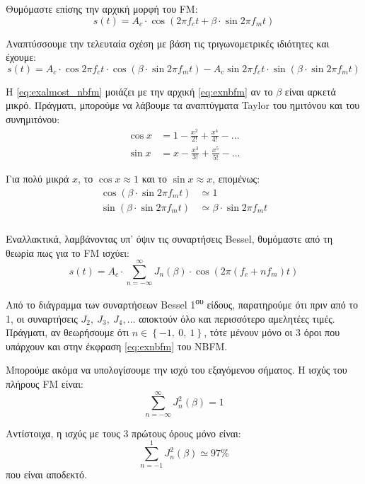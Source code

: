 \documentclass[11pt,a4paper,notitlepage,fleqn,final]{article}
\begin{document}
Θυμόμαστε επίσης την αρχική μορφή του FM:
\[
s(t) = A_c \cdot \cos\left(2πf_c t + β\cdot \sin 2πf_m t\right)
\]

Αναπτύσσουμε την τελευταία σχέση με βάση τις τριγωνομετρικές ιδιότητες και έχουμε:
\begin{equation}
	s(t) = A_c \cdot \cos 2πf_c t \cdot \cos \left(
	β\cdot \sin2π f_m t
	\right) - A_c \sin 2πf_c t \cdot \sin(β\cdot \sin 2πf_m t)
	\label{eq:exalmost_nbfm}
\end{equation}

Η \eqref{eq:exalmost_nbfm} μοιάζει με την αρχική \eqref{eq:exnbfm} αν το \( β \) είναι
αρκετά μικρό. Πράγματι, μπορούμε να λάβουμε τα αναπτύγματα Taylor του ημιτόνου και του
συνημιτόνου:
\begin{align*}
	\cos x &= 1 - \frac{x^2}{2!} + \frac{x^4}{4!} - \dots \\
	\sin x &= x - \frac{x^3}{3!} + \frac{x^5}{5!} - \dots
\end{align*}

Για πολύ μικρά \( x \), το \( \cos x \approx 1 \) και το \( \sin x \approx x \), επομένως:
\begin{align*}
	\cos(β\cdot\sin 2πf_m t) &\simeq 1 \\
	\sin(β\cdot \sin 2πf_m t) &\simeq β\cdot \sin 2πf_m t
\end{align*}

\subparagraph{}
Εναλλακτικά, λαμβάνοντας υπ' όψιν τις συναρτήσεις Bessel, θυμόμαστε από τη θεωρία πως για το
FM ισχύει:
\[
s(t) = A_c \cdot \sum_{n=-\infty}^{\infty} J_n(β)
\cdot \cos\left(2π\left(f_c+nf_m\right)t\right)
\]

Από το διάγραμμα των συναρτήσεων Bessel 1\textsuperscript{ου} είδους, παρατηρούμε ότι πριν
από το 1, οι συναρτήσεις \( J_2,\ J_3,\ J_4, \dots \) αποκτούν όλο και περισσότερο
αμελητέες τιμές. Πράγματι, αν θεωρήσουμε ότι \( n \in \left\lbrace -1,\ 0,\ 1 \right\rbrace \),
τότε μένουν μόνο οι 3 όροι που υπάρχουν και στην έκφραση \eqref{eq:exnbfm} του NBFM.

Μπορούμε ακόμα να υπολογίσουμε την ισχύ του εξαγόμενου σήματος. Η ισχύς του πλήρους
FM είναι:
\[
\sum_{n=-\infty}^{\infty} J_n^2(β) = 1
\]

Αντίστοιχα, η ισχύς με τους 3 πρώτους όρους μόνο είναι:
\[
\sum_{n=-1}^{1}J_n^2 (β) \simeq 97\%
\]
που είναι αποδεκτό.

\appendix

\glsaddall
\printglossary[nonumberlist]
\end{document}
